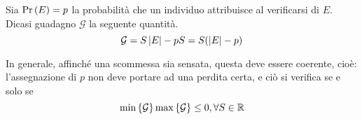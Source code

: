\documentclass{subfiles}
\begin{document}
\begin{Definition*}
    Sia \(\Prob{E} = p\) la probabilità che un individuo attribuisce al verificarsi di \(E\).
    Dicasi guadagno \(\mathcal{G}\) la seguente quantità.
    \[
        \mathcal{G} = S \left\vert E \right\vert - pS = S(\left\vert E \right\vert - p)
    \]
\end{Definition*}
In generale, affinché una scommessa sia sensata, questa deve essere coerente, cioè:
l'assegnazione di \(p\) non deve portare ad una perdita certa, e ciò si verifica se e solo se
\[
    \Min{\mathcal{G}} \Max{\mathcal{G}} \le 0, \forall S \in \Real
\]
\end{document}

